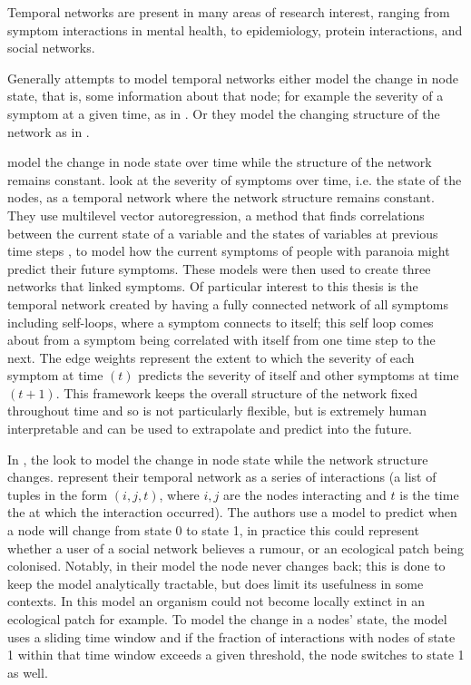 \documentclass[12pt]{amsart}
\begin{document}
    Temporal networks are present in many areas of research interest, ranging from symptom interactions in mental health\cite{jordan2020current,contreras2020temporal}, to epidemiology\cite{masuda2013predicting}, protein interactions\cite{lucas2021inferring,jin2009identifying}, and social networks\cite{moinet2015burstiness,hanneke2010discrete}.     
    
    Generally attempts to model temporal networks either model the change in node state, that is, some information about that node; for example the severity of a symptom at a given time, as in \cite{contreras2020temporal}. Or they model the changing structure of the network as in \cite{sanna2021link}. 

     \cite{contreras2020temporal} model the change in node state over time while the structure of the network remains constant.  look at the severity of symptoms over time, i.e. the state of the nodes, as a temporal network where the network structure remains constant. They use multilevel vector autoregression, a method that finds correlations between the current state of a variable and the states of variables at previous time steps \cite{singer2003applied}, to model how the current symptoms of people with paranoia might predict their future symptoms. These models were then used to create three networks that linked symptoms. Of particular interest to this thesis is the temporal network created by having a fully connected network of all symptoms including self-loops, where a symptom connects to itself; this self loop comes about from a symptom being correlated with itself from one time step to the next. The edge weights represent the extent to which the severity of each symptom at time $(t)$ predicts the severity of itself and other symptoms at time $(t+1)$. This framework keeps the overall structure of the network fixed throughout time and so is not particularly flexible, but is extremely human interpretable and can be used to extrapolate and predict into the future. 

    In \cite{KARIMI20133476}, the  look to model the change in node state while the network structure changes.  represent their temporal network as a series of interactions (a list of tuples in the form $(i,j,t)$, where $i,j$ are the nodes interacting and $t$ is the time the at which the interaction occurred). The authors use a model to predict when a node will change from state 0 to state 1, in practice this could represent whether a user of a social network believes a rumour, or an ecological patch being colonised. Notably, in their model the node never changes back; this is done to keep the model analytically tractable, but does limit its usefulness in some contexts. In this model an organism could not become locally extinct in an ecological patch for example. To model the change in a nodes' state, the model uses a sliding time window and if the fraction of interactions with nodes of state 1 within that time window exceeds a given threshold, the node switches to state 1 as well. 
\end{document}
